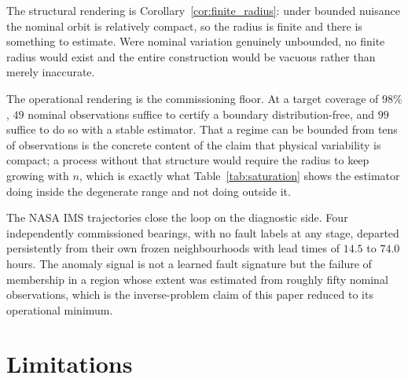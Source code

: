 \documentclass[a4paper]{cas-sc}
\begin{document}
The structural rendering is
Corollary~\ref{cor:finite_radius}: under bounded nuisance the nominal orbit
is relatively compact, so the radius is finite and there is something to
estimate. Were nominal variation genuinely unbounded, no finite radius would
exist and the entire construction would be vacuous rather than merely
inaccurate.

The operational rendering is the commissioning floor. At a target coverage of
\(98\%\), \(49\) nominal observations suffice to certify a boundary
distribution-free, and \(99\) suffice to do so with a stable estimator. That a
regime can be bounded from tens of observations is the concrete content of the
claim that physical variability is compact; a process without that structure
would require the radius to keep growing with \(n\), which is exactly what
Table~\ref{tab:saturation} shows the estimator doing inside the degenerate
range and not doing outside it.

The NASA IMS trajectories close the loop on the diagnostic side. Four
independently commissioned bearings, with no fault labels at any stage,
departed persistently from their own frozen neighbourhoods with lead times of
\(14.5\) to \(74.0\) hours. The anomaly signal is not a learned fault
signature but the failure of membership in a region whose extent was estimated
from roughly fifty nominal observations, which is the inverse-problem claim of
this paper reduced to its operational minimum.

\section{Limitations}
\label{sec:limitations}
\end{document}
